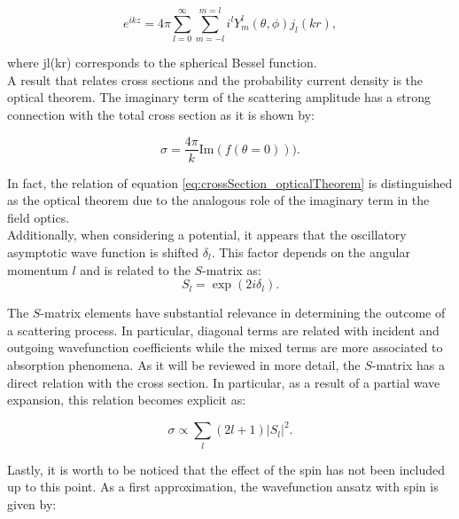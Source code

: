 \documentclass[openany]{book}
\begin{document}
\begin{equation} \label{eq:scattering_planeWave_expansion}
	e^{ikz} = 4\pi  \sum_{l = 0}^{\infty}  \sum_{m = -l}^{m=l} { i^l Y^{l}_{m}(\theta, \phi) j_l(kr)},
\end{equation}

where jl(kr) corresponds to the spherical Bessel function. \\

A result that relates cross sections and the probability current density is the optical theorem. The imaginary term of the scattering amplitude has a strong connection with the total cross section as it is shown by: 

\begin{equation}  \label{eq:crossSection_opticalTheorem}
	\sigma = \frac{4 \pi }{k} \mathrm{Im}(f(\theta = 0))).
\end{equation}

In fact, the relation of equation \ref{eq:crossSection_opticalTheorem} is distinguished as the optical theorem due to the analogous role of the imaginary term in the field optics. \\

Additionally, when considering a potential, it appears that the oscillatory asymptotic wave function is shifted $\delta_l$. This factor depends on the angular momentum $l$ and is related to the $S$-matrix as: \\

\begin{equation}  \label{eq:crossSection_Smatrix_definition}
	S_l = \exp {(2i \delta_l)}.
\end{equation}

The $S$-matrix elements have substantial relevance in determining the outcome of a scattering process. In particular, diagonal terms are related with incident and outgoing wavefunction coefficients while the mixed terms are more associated to absorption phenomena. As it will be reviewed in more detail, the $S$-matrix has a direct relation with the cross section. In particular, as a result of a partial wave expansion, this relation becomes explicit as:

\begin{equation}  \label{eq:crossSection_Smatrix_relation}
	\sigma \propto \sum_{l} (2l + 1) |S_l|^2. 
\end{equation}

Lastly, it is worth to be noticed that the effect of the spin has not been included up to this point. As a first approximation, the 
wavefunction ansatz with spin is given by:
\end{document}
